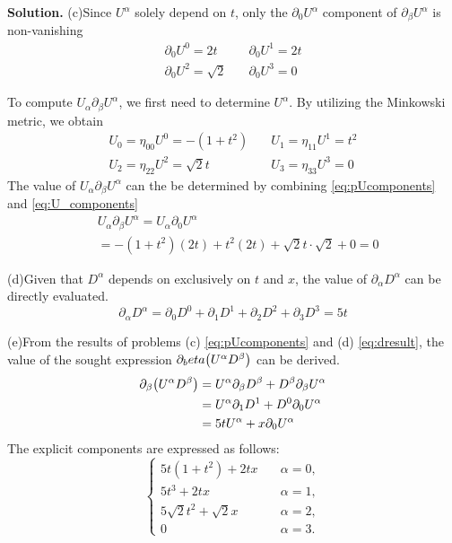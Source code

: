 \documentclass[12pt, a4paper, oneside]{article}
\newenvironment{solution}{\par\noindent\textbf{Solution. }}{\par}
\newcommand{\p}{\partial}
\begin{document}
\begin{solution}
    (c)Since $U^\alpha$ solely depend on $t$, only the $\p_0 U^\alpha$ component of $\p_\beta U^\alpha$ is non-vanishing
    \begin{equation}\label{eq:pUcomponents}
        \begin{split}
            \p_0 U^0 = 2t\quad&\p_0 U^1 = 2t\\
            \p_0 U^2 = \sqrt{2}\quad&\p_0 U^3 = 0
        \end{split}
    \end{equation}

    To compute $U_\alpha\p_\beta U^\alpha$, we first need to determine $U^\alpha$. By utilizing the Minkowski metric, we obtain
    \begin{equation}\label{eq:U_components}
        \begin{split}
            U_0 = \eta_{00}U^0 = -(1+t^2)\quad&U_1 = \eta_{11}U^1 = t^2\\
            U_2 = \eta_{22}U^2 = \sqrt{2}t\quad&U_3 = \eta_{33}U^3 = 0
        \end{split}
    \end{equation}
    The value of $U_\alpha\p_\beta U^\alpha$ can the be determined by combining \cref{eq:pUcomponents} and \cref{eq:U_components}
    \begin{align}
        &U_\alpha\p_\beta U^\alpha = U_\alpha\p_0 U^\alpha\nonumber\\
        &=-(1+t^2)(2t)+t^2(2t)+\sqrt{2}t\cdot\sqrt{2}+0 = 0
    \end{align}

    (d)Given that $D^\alpha$ depends on exclusively on $t$ and $x$, the value of $\p_\alpha D^\alpha$ can be directly evaluated.
    \begin{equation}
        \p_\alpha D^\alpha = \p_0 D^0 + \p_1 D^1 +\p_2 D^2 + \p_3 D^3 = 5t\label{eq:dresult}
    \end{equation}

    (e)From the results of problems (c) \cref{eq:pUcomponents} and (d) \cref{eq:dresult}, the value of the sought expression $\p_beta\qty(U^\alpha D^\beta)$ can be derived.
    \begin{equation}
        \begin{split}
            \p_\beta\qty(U^\alpha D^\beta)&=U^\alpha\p_\beta D^\beta + D^\beta\p_\beta U^\alpha\\
                                          &=U^\alpha\p_1 D^1 + D^0\p_0 U^\alpha\\
                                          &=5tU^\alpha + x\p_0 U^\alpha
        \end{split}
    \end{equation}
    The explicit components are expressed as follows:
    \begin{equation}
        \begin{cases}
            5t(1+t^2)+2tx\quad&\alpha=0,\\
            5t^3+2tx\quad&\alpha=1,\\
            5\sqrt{2}t^2+\sqrt{2}x\quad&\alpha=2,\\
            0\quad&\alpha=3.
        \end{cases}
    \end{equation}


\end{solution}
\end{document}
